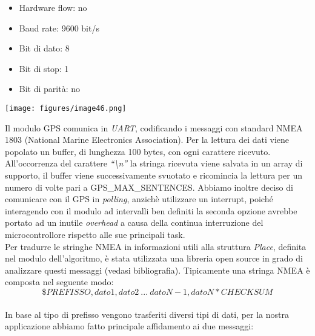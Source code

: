 \begin{itemize}
\item
  
  Hardware flow: no
  
\item
  
  Baud rate: 9600 bit/s
  
\item
  
  Bit di dato: 8
  
\item
  
  Bit di stop: 1
  
\item
  
  Bit di parità: no
  
\end{itemize}

\begin{center}
\texttt{[image: figures/image46.png]}
\captionsetup{type=figure}
\end{center}

\noindent Il modulo GPS comunica in \emph{UART}, codificando i messaggi con standard NMEA 1803
(National Marine Electronics Association). Per la lettura dei dati viene
popolato un buffer, di lunghezza 100 bytes, con ogni carattere ricevuto.
All'occorrenza del carattere \emph{``\textbackslash n''} la stringa
ricevuta viene salvata in un array di supporto, il buffer viene
successivamente svuotato e ricomincia la lettura per un numero di volte pari a
GPS\_MAX\_SENTENCES. Abbiamo inoltre deciso di comunicare con il
GPS in \textit{polling}, anzichè utilizzare un interrupt, poiché interagendo con
il modulo ad intervalli ben definiti la seconda opzione avrebbe portato
ad un inutile \textit{overhead} a causa della continua interruzione del
microcontrollore rispetto alle sue principali task.\\
Per tradurre le stringhe NMEA in informazioni utili alla struttura
\emph{Place}, definita nel modulo dell'algoritmo, è stata utilizzata una
libreria open source in grado di analizzare questi messaggi (vedasi
bibliografia). Tipicamente una stringa NMEA è composta nel seguente
modo:\\
\[\$ PREFISSO,dato1,dato2\ ...\ datoN - 1,datoN*CHECKSUM\]\\
In base al tipo di prefisso vengono trasferiti diversi tipi di dati, per
la nostra applicazione abbiamo fatto principale affidamento ai due
messaggi:

